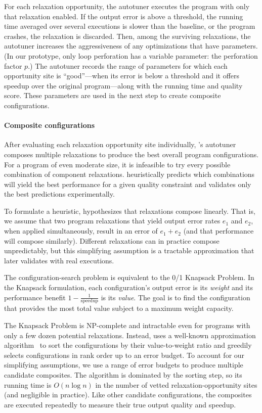 For each relaxation opportunity, the autotuner executes the program
with only that relaxation enabled.
If the output error is above a threshold, the running time averaged over
several executions is slower than the baseline,
or the program crashes, the relaxation is discarded.
Then, among the surviving relaxations, the autotuner increases the
aggressiveness of any optimizations that have parameters.
(In our prototype, only loop perforation has a variable
parameter: the perforation factor $p$.)
The autotuner records the range of parameters for which each opportunity site
is ``good''---when its error is below a threshold and it offers
speedup over the original program---along with the running time and
quality score.
These parameters are used in the next step to create composite configurations.

\paragraph{Composite configurations}

After evaluating each relaxation opportunity site individually, \sysname's
autotuner composes multiple relaxations to produce the best overall
program configurations. For a program of even moderate size, it is infeasible to
try every possible combination of component relaxations.
\sysname heuristically predicts which combinations will yield the
best performance for a given quality constraint and validates only the best
predictions experimentally.

To formulate a heuristic, \sysname
hypothesizes that
relaxations compose linearly. That is, we assume that two program relaxations
that yield output error rates $e_1$ and $e_2$, when applied simultaneously,
result in an error of $e_1 + e_2$ (and that performance
will compose similarly).
Different relaxations can in practice compose unpredictably,
but this simplifying assumption is a tractable approximation that \sysname
later validates with real executions.

The configuration-search problem
is equivalent to
the 0/1 Knapsack Problem.
In the
Knapsack formulation, each configuration's output error is its \emph{weight}
and its performance benefit $1 - \frac{1}{\text{speedup}}$ is its
\emph{value}. The goal is to find the configuration that provides
the most total value subject to a maximum weight capacity.

The Knapsack Problem is NP-complete and intractable
even for programs with only a few dozen potential relaxations.
Instead, \sysname uses a well-known approximation algorithm~\cite{knapsack}
to sort the configurations by
their value-to-weight ratio and greedily selects configurations in rank order
up to an error budget.
To account for our simplifying assumptions, we use a range of error budgets to
produce multiple candidate composites.
The
algorithm is dominated by the sorting step, so its running time is
$O(n \log n)$ in the number of vetted relaxation-opportunity sites (and
negligible in practice).
%
Like other candidate configurations, the composites are executed
repeatedly to measure their true output quality and speedup.
